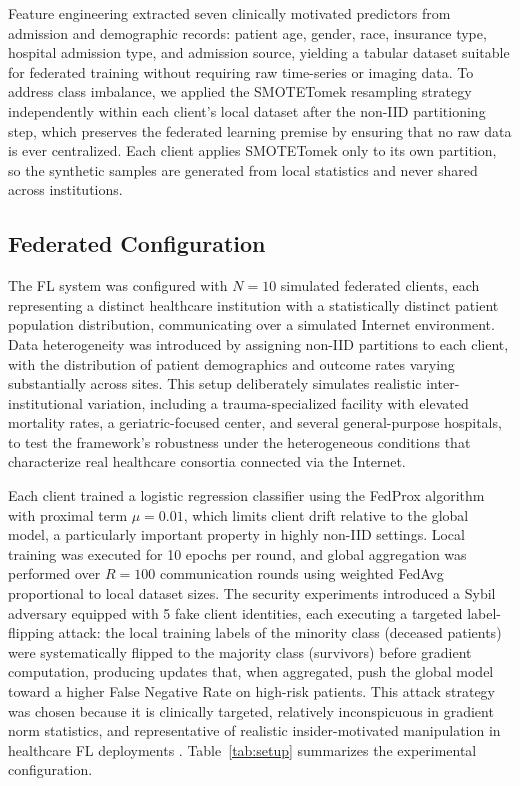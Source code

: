 \documentclass{sbc2023}
\begin{document}
Feature engineering extracted seven clinically motivated predictors from admission and demographic records: patient age, gender, race, insurance type, hospital admission type, and admission source, yielding a tabular dataset suitable for federated training without requiring raw time-series or imaging data. To address class imbalance, we applied the SMOTETomek resampling strategy \citep{batista2004balancing} independently within each client's local dataset after the non-IID partitioning step, which preserves the federated learning premise by ensuring that no raw data is ever centralized. Each client applies SMOTETomek only to its own partition, so the synthetic samples are generated from local statistics and never shared across institutions.

\subsection{Federated Configuration}

The FL system was configured with $N = 10$ simulated federated clients, each representing a distinct healthcare institution with a statistically distinct patient population distribution, communicating over a simulated Internet environment. Data heterogeneity was introduced by assigning non-IID partitions to each client, with the distribution of patient demographics and outcome rates varying substantially across sites. This setup deliberately simulates realistic inter-institutional variation, including a trauma-specialized facility with elevated mortality rates, a geriatric-focused center, and several general-purpose hospitals, to test the framework's robustness under the heterogeneous conditions that characterize real healthcare consortia connected via the Internet.

Each client trained a logistic regression classifier using the FedProx algorithm \citep{li2020federated} with proximal term $\mu = 0.01$, which limits client drift relative to the global model, a particularly important property in highly non-IID settings. Local training was executed for 10 epochs per round, and global aggregation was performed over $R = 100$ communication rounds using weighted FedAvg proportional to local dataset sizes. The security experiments introduced a Sybil adversary equipped with 5 fake client identities, each executing a targeted label-flipping attack: the local training labels of the minority class (deceased patients) were systematically flipped to the majority class (survivors) before gradient computation, producing updates that, when aggregated, push the global model toward a higher False Negative Rate on high-risk patients. This attack strategy was chosen because it is clinically targeted, relatively inconspicuous in gradient norm statistics, and representative of realistic insider-motivated manipulation in healthcare FL deployments \citep{jimenez2025security}. Table~\ref{tab:setup} summarizes the experimental configuration.
\end{document}
